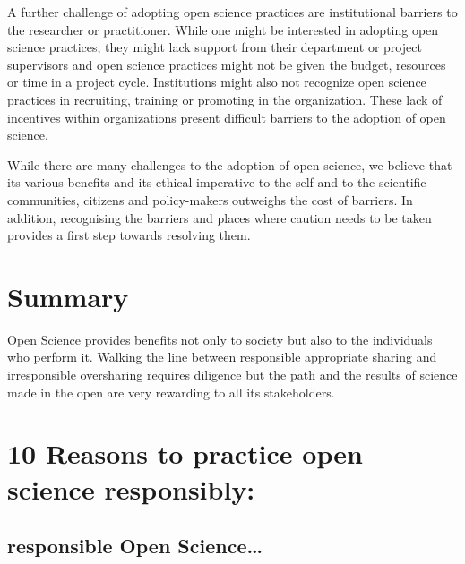 \documentclass[
  letterpaper,
  DIV=11,
  numbers=noendperiod]{scrreport}
\begin{document}
A further challenge of adopting open science practices are institutional
barriers to the researcher or practitioner. While one might be
interested in adopting open science practices, they might lack support
from their department or project supervisors and open science practices
might not be given the budget, resources or time in a project cycle.
Institutions might also not recognize open science practices in
recruiting, training or promoting in the organization. These lack of
incentives within organizations present difficult barriers to the
adoption of open science.

While there are many challenges to the adoption of open science, we
believe that its various benefits and its ethical imperative to the self
and to the scientific communities, citizens and policy-makers outweighs
the cost of barriers. In addition, recognising the barriers and places
where caution needs to be taken provides a first step towards resolving
them.

\hypertarget{summary-1}{%
\section{Summary}\label{summary-1}}

Open Science provides benefits not only to society but also to the
individuals who perform it. Walking the line between responsible
appropriate sharing and irresponsible oversharing requires diligence but
the path and the results of science made in the open are very rewarding
to all its stakeholders.

\hypertarget{reasons-to-practice-open-science-responsibly}{%
\section{10 Reasons to practice open science
responsibly:}\label{reasons-to-practice-open-science-responsibly}}

\hypertarget{responsible-open-science}{%
\subsection{responsible Open
Science\ldots{}}\label{responsible-open-science}}
\end{document}
